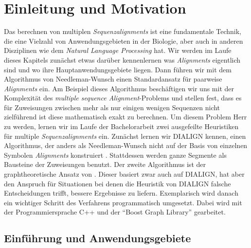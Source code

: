 \chapter{Einleitung und Motivation}
\label{ch:einleitung}

Das berechnen von multiplen \emph{Sequenzalignments} ist eine fundamentale Technik, die eine Vielzahl von Anwendungsgebieten in der Biologie, aber auch in anderen Disziplinen wie dem \emph{Natural Language Processing} hat. Wir werden im Laufe dieses Kapitels zunächst etwas darüber kennenlernen was \emph{Alignments} eigentlich sind  und wo ihre Hauptanwendungsgebiete liegen. Dann führen wir mit dem Algorithmus von Needleman-Wunsch einen Standardansatz für paarweise \emph{Alignments} ein. Am Beispiel dieses Algorithmus beschäftigen wir uns mit der Komplexität des \emph{multiple sequence Alignment}-Problems und stellen fest, dass es für Zuweisungen zwischen mehr als nur einigen wenigen Sequenzen nicht zielführend ist diese mathematisch exakt zu berechnen. Um diesem Problem Herr zu werden, lernen wir im Laufe der Bachelorarbeit zwei ausgefeilte Heuristiken für multiple \emph{Sequenzalignments} ein. Zunächst lernen wir DIALIGN kennen, einen Algorithmus, der anders als Needleman-Wunsch nicht auf der Basis von einzelnen Symbolen \emph{Alignments} konstruiert \citep{mdw96}. Stattdessen werden ganze Segmente als Bausteine der Zuweisungen benutzt. Der zweite Algorithmus ist der graphtheoretische Ansatz von \cite{cpm10}. Dieser basiert zwar auch auf DIALIGN, hat aber den Anspruch für Situationen bei denen die Heuristik von DIALIGN falsche Entscheidungen trifft, bessere Ergebnisse zu liefern. Exemplarisch wird danach ein wichtiger Schritt des Verfahrens programmatisch umgesetzt. Dabei wird mit der Programmiersprache C++ und der \enquote{Boost Graph Library} gearbeitet.

\section{Einführung und Anwendungsgebiete}

